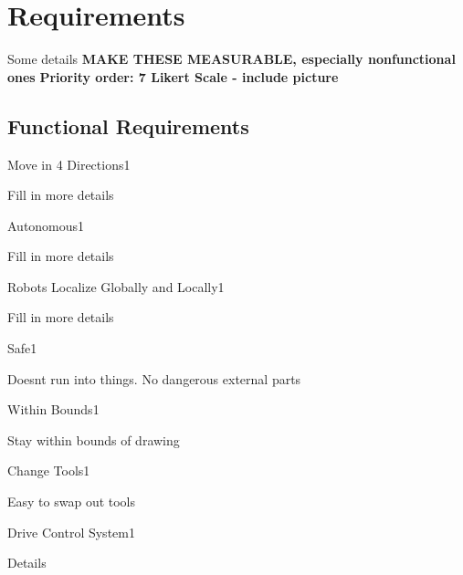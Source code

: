 
\section{Requirements}
\label{sec:requirements}
Some details
\textbf{MAKE THESE MEASURABLE, especially nonfunctional ones}
\textbf{Priority order: 7 Likert Scale - include picture}

\subsection{Functional Requirements}
\label{sec:functional_requirements}

\begin{functional_requirement}{Move in 4 Directions}{1}
\item Fill in more details 
\end{functional_requirement}

\begin{functional_requirement}{Autonomous}{1}
\item Fill in more details 
\end{functional_requirement}

\begin{functional_requirement}{Robots Localize Globally and Locally}{1}
\item Fill in more details 
\end{functional_requirement}

\begin{functional_requirement}{Safe}{1}
\item Doesnt run into things. No dangerous external parts
\end{functional_requirement}

\begin{functional_requirement}{Within Bounds}{1}
\item Stay within bounds of drawing
\end{functional_requirement}

\begin{functional_requirement}{Change Tools}{1}
\item Easy to swap out tools
\end{functional_requirement}

\begin{functional_requirement}{Drive Control System}{1}
\item Details
\end{functional_requirement}

